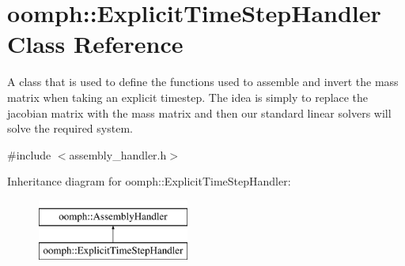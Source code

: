 \hypertarget{classoomph_1_1ExplicitTimeStepHandler}{}\section{oomph\+:\+:Explicit\+Time\+Step\+Handler Class Reference}
\label{classoomph_1_1ExplicitTimeStepHandler}


A class that is used to define the functions used to assemble and invert the mass matrix when taking an explicit timestep. The idea is simply to replace the jacobian matrix with the mass matrix and then our standard linear solvers will solve the required system.  




{\ttfamily \#include $<$assembly\+\_\+handler.\+h$>$}

Inheritance diagram for oomph\+:\+:Explicit\+Time\+Step\+Handler\+:\begin{figure}[H]
\begin{center}
\leavevmode
\includegraphics[height=2.000000cm]{classoomph_1_1ExplicitTimeStepHandler}
\end{center}
\end{figure}
